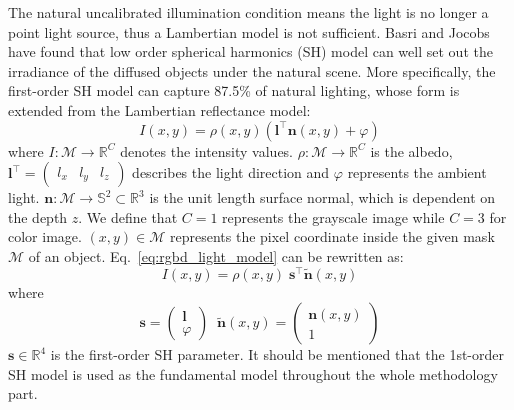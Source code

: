 The natural uncalibrated illumination condition means the light is no longer a point light source, thus a Lambertian model is not sufficient. 
Basri and Jocobs~\cite{basri2003lambertian} have found that low order spherical harmonics (SH) model can well set out the irradiance of the diffused objects under the natural scene.
More specifically, the first-order SH model can capture 87.5\% of natural lighting, whose form is extended from the Lambertian reflectance model:
\begin{equation}\label{eq:rgbd_light_model}
I(x,y) = \rho(x,y)(\mathbf{l}^\top \mathbf{n}(x,y) + \varphi)
\end{equation}
where $I : \mathcal{M}\rightarrow \mathbb{R}^C$ denotes the intensity values. 
$\rho : \mathcal{M}\rightarrow \mathbb{R}^C$ is the albedo, $\mathbf{l}^\top = \begin{pmatrix} l_x & l_y & l_z \end{pmatrix}$ describes the light direction and $\varphi$ represents the ambient light.
$\mathbf{n} : \mathcal{M}\rightarrow \mathbb{S}^2 \subset \mathbb{R}^3$ is the unit length surface normal, which is dependent on the depth $z$.
We define that $C = 1$ represents the grayscale image while $C = 3$ for color image. 
$(x,y) \in \mathcal{M}$ represents the pixel coordinate inside the given mask $\mathcal{M}$ of an object.
Eq.~\ref{eq:rgbd_light_model} can be rewritten as:
\begin{equation}\label{eq:rgbd_light_model2}
I(x,y) = \rho(x,y) \; \mathbf{s}^\top \tilde{\mathbf{n}}(x,y)
\end{equation}
where
\begin{equation}
\mathbf{s} = \begin{pmatrix}\mathbf{l} \\ \varphi \end{pmatrix} 
 \; \; 
\tilde{\mathbf{n}}(x,y) = \begin{pmatrix}\mathbf{n}(x,y) \\ 1\end{pmatrix}
\end{equation}
$\mathbf{s}\in\mathbb{R}^4$ is the first-order SH parameter. It should be mentioned that the 1st-order SH model is used as the fundamental model throughout the whole methodology part.

